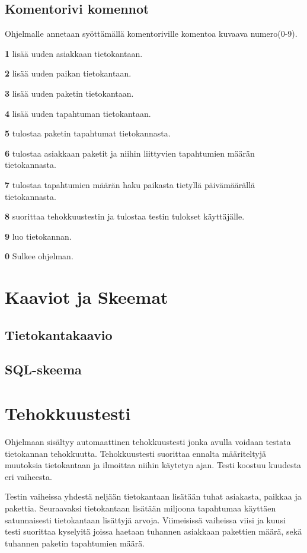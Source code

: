 \documentclass[11pt,a4paper]{article}
\begin{document}
\subsection*{Komentorivi komennot}
Ohjelmalle annetaan syöttämällä komentoriville komentoa kuvaava numero(0-9).
\begin{description}
\item \textbf{1} lisää uuden asiakkaan tietokantaan.
\item \textbf{2} lisää uuden paikan tietokantaan.
\item \textbf{3} lisää uuden paketin tietokantaan.
\item \textbf{4} lisää uuden tapahtuman tietokantaan.
\item \textbf{5} tulostaa paketin tapahtumat tietokannasta.
\item \textbf{6} tulostaa asiakkaan paketit ja niihin liittyvien tapahtumien määrän tietokannasta.
\item \textbf{7} tulostaa tapahtumien määrän haku paikasta tietyllä päivämäärällä tietokannasta.
\item \textbf{8} suorittaa tehokkuustestin ja tulostaa testin tulokset käyttäjälle.
\item \textbf{9} luo tietokannan.
\item \textbf{0} Sulkee ohjelman.
\end{description}

\newpage
\section{Kaaviot ja Skeemat}
\subsection*{Tietokantakaavio}

\subsection*{SQL-skeema}

\newpage
\section{Tehokkuustesti}
Ohjelmaan sisältyy automaattinen tehokkuustesti jonka avulla voidaan testata tietokannan tehokkuutta. Tehokkuustesti suorittaa ennalta määriteltyjä muutoksia tietokantaan ja ilmoittaa niihin käytetyn ajan. Testi koostuu kuudesta eri vaiheesta. 

Testin vaiheissa yhdestä neljään tietokantaan lisätään tuhat asiakasta, paikkaa ja pakettia. Seuraavaksi tietokantaan lisätään miljoona tapahtumaa käyttäen satunnaisesti tietokantaan lisättyjä arvoja. Viimeisissä vaiheissa viisi ja kuusi testi suorittaa kyselyitä joissa haetaan tuhannen asiakkaan pakettien määrä, sekä tuhannen paketin tapahtumien määrä.
\end{document}
